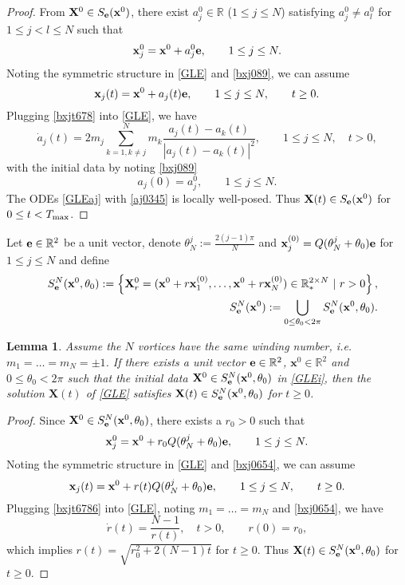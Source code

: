 \documentclass{aims}
\theoremstyle{plain}
\newtheorem{lemma}{Lemma}[section]
\theoremstyle{definition}
\newcommand{\bx}{{\mathbf x}}
\newcommand{\bX}{{\mathbf X}}
\newcommand{\be} {\begin{equation}}
\newcommand{\ee}{\end{equation}}
\newcommand{\beas}{\begin{eqnarray*}}
\newcommand{\eeas}{\end{eqnarray*} }
\begin{document}
\begin{proof} From $\bX^0\in S_{\bf e}(\bx^0)$, there exist $a_j^0\in {\mathbb R}$ ($1\le j\le N$) satisfying $a_j^0\ne a_l^0$ for $1\le j<l\le N$ such that
\be \label{bxj089}
\bx_j^0=\bx^0+a_j^0 {\bf e}, \qquad 1\le j\le N.
\ee
Noting the symmetric structure in \eqref{GLE} and \eqref{bxj089}, we can assume
\be\label{bxjt678}
\bx_j(t)=\bx^0+a_j(t) {\bf e}, \qquad 1\le j\le N, \qquad t\ge0.
\ee
Plugging \eqref{bxjt678} into \eqref{GLE}, we have
\be\label{GLEaj}
\dot{a}_j(t)=2m_j\sum_{k=1,k\neq
j}^{N}m_k\frac{a_j(t)-a_k(t)}{\left|
a_j(t)-a_k(t)\right|^2},\qquad 1\le j\le N, \quad t> 0,
\ee
with the initial data by noting \eqref{bxj089}
\be\label{aj0345}
a_j(0)=a_j^0, \qquad 1\le j\le N.
\ee
The ODEs \eqref{GLEaj} with \eqref{aj0345} is locally well-posed.
Thus $\bX(t)\in S_{\bf e}(\bx^0)$ for $0\le t<T_{\rm max}$.
\end{proof}

Let ${\bf e}\in {\mathbb R}^2$
be a  unit vector, denote $\theta_N^j:=\frac{2(j-1)\pi}{N}$
and $\bx_j^{(0)}=Q(\theta_N^j+\theta_0){\bf e}$
for $1\le j\le N$ and define
\beas
&&S_{{\bf e}}^N(\bx^0,\theta_0):=\left\{\bX^0_r=(\bx^0+r\bx_1^{(0)},\ldots,\bx^0+
r\bx_N^{(0)})\in {\mathbb R}_*^{2\times N} \ |\ r>0\right\},\\
&&S_{{\bf e}}^N(\bx^0):=\displaystyle\bigcup_{0\le \theta_0<2\pi}S_{{\bf e}}^N(\bx^0,\theta_0).
\eeas

\begin{lemma}\label{plogon1}
Assume the $N$ vortices have the same winding number,
i.e. $m_1=\ldots=m_N=\pm1$. If there exists a unit vector ${\bf e}\in {\mathbb R}^2$, $\bx^0\in{\mathbb R}^2$ and $0\le \theta_0<2\pi$ such that
the initial data  $\bX^0\in
S_{{\bf e}}^N(\bx^0,\theta_0)$ in \eqref{GLEi},  then the solution $\bX(t)$ of \eqref{GLE} satisfies
$\bX(t)\in S_{\bf e}^N(\bx^0,\theta_0)$ for $t\ge0$.
\end{lemma}

\begin{proof} Since $\bX^0\in
S_{{\bf e}}^N(\bx^0,\theta_0)$, there exists a $r_0>0$ such that
\be\label{bxj0654}
\bx_j^0=\bx^0+r_0Q(\theta_N^j+\theta_0){\bf e}, \qquad  1\le j\le N.
\ee
Noting the symmetric structure in \eqref{GLE} and \eqref{bxj0654}, we can assume
\be\label{bxjt6786}
\bx_j(t)=\bx^0+r(t)Q(\theta_N^j+\theta_0){\bf e}, \qquad 1\le j\le N, \qquad t\ge0.
\ee
Plugging \eqref{bxjt6786} into \eqref{GLE}, noting $m_1=\ldots=m_N$ and \eqref{bxj0654}, we have \cite{Zhang1,Zhang2}
\begin{equation*}
\dot{r}(t)=\frac{N-1}{r(t)}, \quad t> 0, \qquad r(0)=r_0,
\end{equation*}
which implies $r(t)=\sqrt{r_0^2+2(N-1)t}$ for $t\ge0$.
Thus $\bX(t)\in S_{\bf e}^N(\bx^0,\theta_0)$ for $t\ge0$.
\end{proof}
\end{document}
